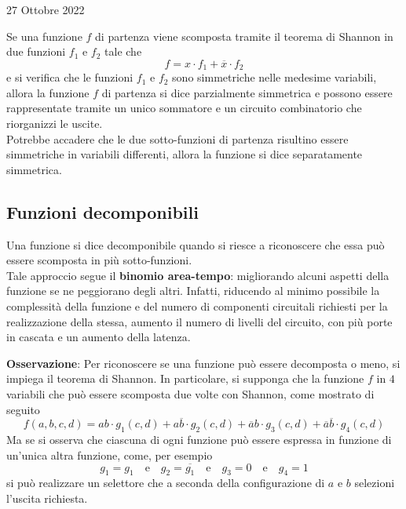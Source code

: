 \documentclass[a4paper]{extarticle}
\begin{document}
\newpage
\begin{center}
    27 Ottobre 2022
\end{center}
Se una funzione $f$ di partenza viene scomposta tramite il teorema di Shannon in due funzioni $f_1$ e $f_2$ tale che
\[f=x \cdot f_1 + \overline{x} \cdot f_2\]
e si verifica che le funzioni $f_1$ e $f_2$ sono simmetriche nelle medesime variabili, allora la funzione $f$ di partenza si dice parzialmente simmetrica e possono essere rappresentate tramite un unico sommatore e un circuito combinatorio che riorganizzi le uscite.\\
Potrebbe accadere che le due sotto-funzioni di partenza risultino essere simmetriche in variabili differenti, allora la funzione si dice separatamente simmetrica.

\vspace{1em}
\noindent
\subsection{Funzioni decomponibili}
Una funzione si dice decomponibile quando si riesce a riconoscere che essa può essere scomposta in più sotto-funzioni.\\
Tale approccio segue il \textbf{binomio area-tempo}: migliorando alcuni aspetti della funzione se ne peggiorano degli altri. Infatti, riducendo al minimo possibile la complessità della funzione e del numero di componenti circuitali richiesti per la realizzazione della stessa, aumento il numero di livelli del circuito, con più porte in cascata e un aumento della latenza.

\vspace{1em}
\noindent
\textbf{Osservazione}: Per riconoscere se una funzione può essere decomposta o meno, si impiega il teorema di Shannon. In particolare, si supponga che la funzione $f$ in $4$ variabili che può essere scomposta due volte con Shannon, come mostrato di seguito
\[f(a,b,c,d)=ab \cdot g_1(c,d)+a\overline{b} \cdot g_2(c,d)+\overline{a}b \cdot g_3(c,d)+\overline{a}\overline{b} \cdot g_4(c,d)\]
Ma se si osserva che ciascuna di ogni funzione può essere espressa in funzione di un'unica altra funzione, come, per esempio
\[g_1=g_1\hspace{1em}\text{e}\hspace{1em}g_2=\overline{g_1}\hspace{1em}\text{e}\hspace{1em}g_3=0\hspace{1em}\text{e}\hspace{1em}g_4=1\]
si può realizzare un selettore che a seconda della configurazione di $a$ e $b$ selezioni l'uscita richiesta.
\end{document}
